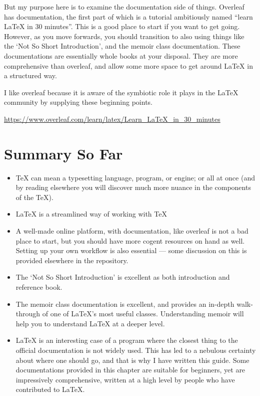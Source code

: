 \documentclass[11pt, oneside]{memoir}
\begin{document}
But my purpose here is to examine the documentation side of things. Overleaf has documentation, the first part of which is a tutorial ambitiously named ``learn LaTeX in 30 minutes''. This is a good place to start if you want to get going. However, as you move forwards, you should transition to also using things like the `Not So Short Introduction', and the memoir class documentation. These documentations are essentially whole books at your disposal. They are more comprehensive than overleaf, and allow some more space to get around LaTeX in a structured way.

I like overleaf because it is aware of the symbiotic role it plays in the LaTeX community by supplying these beginning points.

\url{https://www.overleaf.com/learn/latex/Learn_LaTeX_in_30_minutes}

\section{Summary So Far}
\begin{itemize}
\item \TeX{} can mean a typesetting language, program, or engine; or all at once (and by reading elsewhere you will discover much more nuance in the components of the \TeX{}).
\item \LaTeX{} is a streamlined way of working with \TeX{} 
\item A well-made online platform, with documentation, like overleaf is not a bad place to start, but you should have more cogent resources on hand as well. Setting up your own workflow is also essential — some discussion on this is provided elsewhere in the repository.
\item The `Not So Short Introduction' is excellent as both introduction and reference book.
\item The memoir class documentation is excellent, and provides an in-depth walk-through of one of LaTeX's most useful classes. Understanding memoir will help you to understand LaTeX at a deeper level.
\item \LaTeX{} is an interesting case of a program where the closest thing to the official documentation is not widely used. This has led to a nebulous certainty about where one should go, and that is why I have written this guide. Some documentations provided in this chapter are suitable for beginners, yet are impressively comprehensive, written at a high level by people who have contributed to LaTeX.
\end{itemize}
\end{document}
